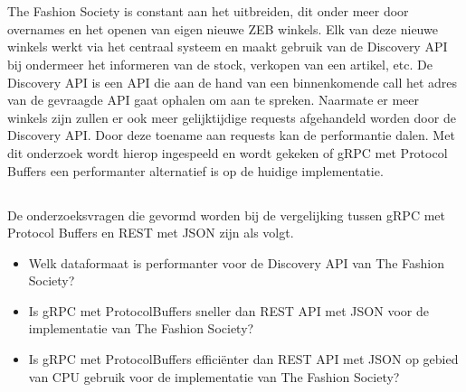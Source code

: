 
\chapter{}
\label{ch:inleiding}



\section{}
\label{sec:probleemstelling}

The Fashion Society is constant aan het uitbreiden, dit onder meer door overnames en het openen van eigen nieuwe ZEB winkels. Elk van deze nieuwe winkels werkt via het centraal systeem en maakt gebruik van de Discovery API bij ondermeer het informeren van de stock, verkopen van een artikel, etc. De Discovery API is een API die aan de hand van een binnenkomende call het adres van de gevraagde API gaat ophalen om aan te spreken. Naarmate er meer winkels zijn zullen er ook meer gelijktijdige requests afgehandeld worden door de Discovery API. Door deze toename aan requests kan de performantie dalen. Met dit onderzoek wordt hierop ingespeeld en wordt gekeken of gRPC met Protocol Buffers een performanter alternatief is op de huidige implementatie.

\section{}
\label{sec:onderzoeksvraag}

De onderzoeksvragen die gevormd worden bij de vergelijking tussen gRPC met Protocol Buffers en REST met JSON zijn als volgt.
\begin{itemize}
    \item Welk dataformaat is performanter voor de Discovery API van The Fashion Society?
    \item Is gRPC met ProtocolBuffers sneller dan REST API met JSON voor de implementatie van The Fashion Society?
    \item Is gRPC met ProtocolBuffers efficiënter dan REST API met JSON op gebied van CPU gebruik voor de implementatie van The Fashion Society?
\end{itemize}

